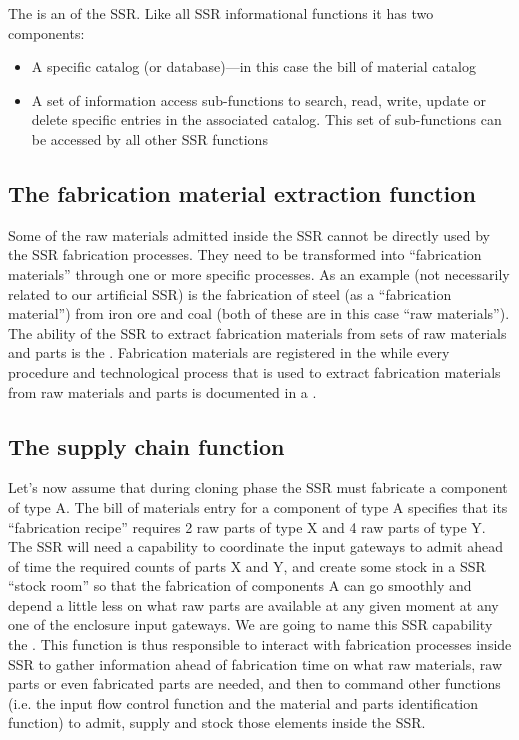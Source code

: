 The  is an  of
the SSR. Like all SSR informational functions it has two components:

\begin{itemize}
\item A specific catalog (or database)---in this case the bill of
material catalog
\item A set of information access sub-functions to search, read, write,
update or delete specific entries in the associated catalog. This set
of sub-functions can be accessed by all other SSR functions 
\end{itemize}

\subsection[The fabrication material extraction function]{The
fabrication material extraction function}

Some of the raw materials
admitted inside the SSR cannot be directly used by the SSR fabrication
processes. They need to be transformed into “fabrication materials”
through one or more specific processes. As an example (not necessarily
related to our artificial SSR) is the fabrication
of steel (as a “fabrication material”) from iron ore and coal (both of
these are in this case “raw materials”). The ability of the SSR to
extract fabrication materials from sets of raw materials and parts is
the .  Fabrication
materials are registered in the  
while every procedure and technological process that is used
to extract fabrication materials from raw materials and parts is
documented in a .

\subsection[The supply chain function]{The supply chain function}

Let’s now assume that during
cloning phase the SSR must fabricate a component of type A.  The bill
of materials entry for a component of type A specifies that its
“fabrication recipe” requires 2 raw parts of type X and 4 raw parts of
type Y.  The SSR will need a capability to coordinate the input
gateways to admit ahead of time the required counts of parts X and Y,
and create some stock in a SSR “stock room” so that the fabrication of
components A can go smoothly and depend a little less on what raw parts
are available at any given moment at any one of the enclosure input
gateways. We are going to name this SSR capability the . 
This function is thus responsible to interact with
fabrication processes inside SSR to gather information ahead of
fabrication time on what raw materials, raw parts or even fabricated
parts are needed, and then to command other functions (i.e. the input flow control function 
and the material and parts identification function) to admit, supply and stock
those elements inside the SSR.


